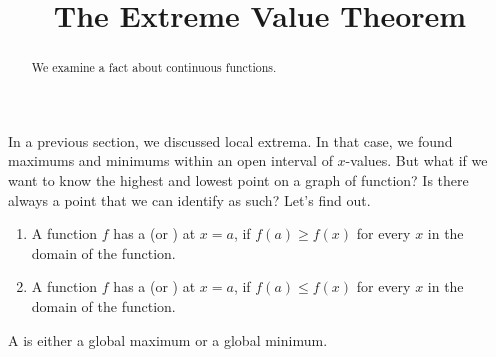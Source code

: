 \documentclass{ximera}
\title{The Extreme Value Theorem}
\begin{document}
\begin{abstract}
  We examine a fact about continuous functions.
\end{abstract}
\maketitle
In a previous section, we discussed local extrema. In that case, we found maximums and minimums within an open interval of $x$-values. But what if we want to know the highest and lowest point on a graph of function? Is there always a point that we can identify as such? Let's find out. 

\begin{definition}\hfil{}
\begin{enumerate}
\item A function $f$ has a  (or ) at $x=a$, if $f(a)\ge
  f(x)$ for every $x$ in the domain of the function.
\item A function $f$ has a  (or ) at $x=a$, if $f(a)\le
  f(x)$ for every $x$ in the domain of the function.
\end{enumerate} 
A  is either a
global maximum or a global minimum.
\end{definition}
\end{document}
